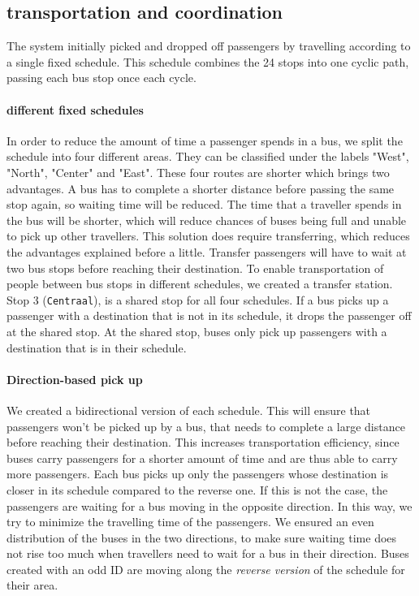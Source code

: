 \documentclass{article}
\begin{document}
\subsection{transportation and coordination}
The system initially picked and dropped off passengers by travelling according to a single fixed schedule. This schedule combines the 24 stops into one cyclic path, passing each bus stop once each cycle.
\paragraph{different fixed schedules}
In order to reduce the amount of time a passenger spends in a bus, we split the schedule into four different areas.
They can be classified under the labels "West", "North", "Center" and "East". These four routes are shorter which brings two advantages. A bus has to complete a shorter distance before passing the same stop again, so waiting time will be reduced. The time that a traveller spends in the bus will be shorter, which will reduce chances of buses being full and unable to pick up other travellers.
\newline
This solution does require transferring, which reduces the advantages explained before a little. Transfer passengers will have to wait at two bus stops before reaching their destination. To enable transportation of people between bus stops in different schedules, we created a transfer station. Stop 3 (\texttt{Centraal}), is a shared stop for all four schedules. If a bus picks up a passenger with a destination that is not in its schedule, it drops the passenger off at the shared stop. At the shared stop, buses only pick up passengers with a destination that is in their schedule. 
\paragraph{Direction-based pick up}
We created a bidirectional version of each schedule. This will ensure that passengers won't be picked up by a bus,  that needs to complete a large distance before reaching their destination. This increases transportation efficiency, since buses carry passengers for a shorter amount of time and are thus able to carry more passengers. 
\newline
Each bus picks up only the passengers whose destination is closer in its schedule compared to the reverse one. If this is not the case, the passengers are waiting for a bus moving in the opposite direction. In this way, we try to minimize the travelling time of the passengers. 
\newline
We ensured an even distribution of the buses in the two directions, to make sure waiting time does not rise too much when travellers need to wait for a bus in their direction. Buses created with an odd ID are moving along the \textit{reverse version} of the schedule for their area.
\end{document}
